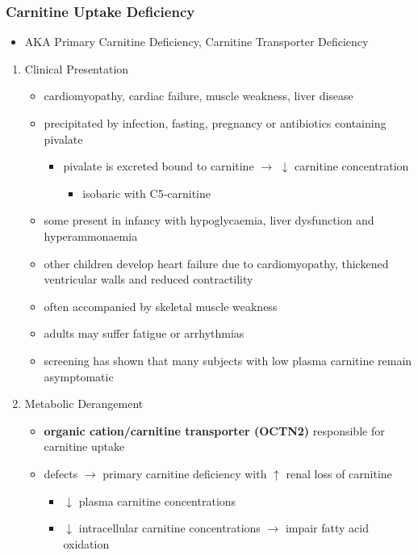 \documentclass[12pt]{scrartcl}
\begin{document}
\subsubsection{Carnitine Uptake Deficiency}
\label{sec:org1fc74b9}
\begin{itemize}
\item AKA Primary Carnitine Deficiency, Carnitine Transporter Deficiency
\end{itemize}
\begin{enumerate}
\item Clinical Presentation
\label{sec:orgfe0b3f5}
\begin{itemize}
\item cardiomyopathy, cardiac failure, muscle weakness, liver disease
\item precipitated by infection, fasting, pregnancy or antibiotics containing pivalate
\begin{itemize}
\item pivalate is excreted bound to carnitine \(\to\) \(\downarrow\) carnitine concentration
\begin{itemize}
\item isobaric with C5-carnitine
\end{itemize}
\end{itemize}
\item some present in infancy with hypoglycaemia, liver dysfunction and hyperammonaemia
\item other children develop heart failure due to cardiomyopathy,
thickened ventricular walls and reduced contractility
\item often accompanied by skeletal muscle weakness
\item adults may suffer fatigue or arrhythmias
\item screening has shown that many subjects with low plasma carnitine remain asymptomatic
\end{itemize}
\item Metabolic Derangement
\label{sec:org0e57784}
\begin{itemize}
\item \textbf{organic cation/carnitine transporter (OCTN2)} responsible for
carnitine uptake
\item defects \(\to\) primary carnitine deficiency with \(\uparrow\) renal loss of carnitine
\begin{itemize}
\item \(\downarrow\) plasma carnitine concentrations
\item \(\downarrow\) intracellular carnitine concentrations \(\to\) impair fatty acid
oxidation
\end{itemize}
\end{itemize}


\end{enumerate}
\end{document}

